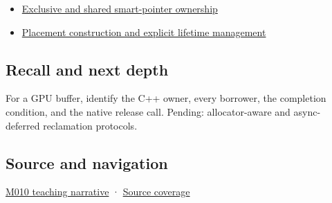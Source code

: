 \begin{itemize}
\tightlist
\item
  \hyperref[appendix-51602cabe815]{Exclusive and shared smart-pointer ownership}
\item
  \hyperref[appendix-f56c3e43fd4e]{Placement construction and explicit lifetime management}
\end{itemize}

\subsection{Recall and next depth}\label{appendix-69739d3ab49b-recall-and-next-depth}

For a GPU buffer, identify the C++ owner, every borrower, the completion condition, and the native release call. Pending: allocator-aware and async-deferred reclamation protocols.

\subsection{Source and navigation}\label{appendix-69739d3ab49b-source-and-navigation}

\hyperref[01-foundations-i-ch004-from-a-live-object-to-responsible-resource-ownership]{M010 teaching narrative} · \hyperref[appendix-fd090d982a15-m010---parts-148-160]{Source coverage}
